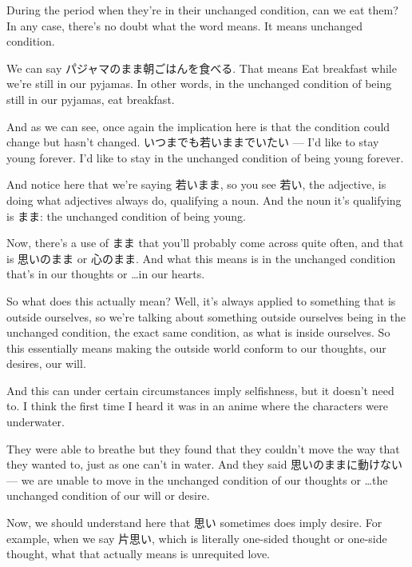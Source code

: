 During the period when they're in their unchanged condition, can we eat them? In any case, there's no doubt what the word means. It means unchanged condition.

We can say パジャマのまま朝ごはんを食べる. That means Eat breakfast while we're still in our pyjamas. In other words, in the unchanged condition of being still in our pyjamas, eat breakfast.

{}

And as we can see, once again the implication here is that the condition could change but hasn't changed. いつまでも若いままでいたい --- I'd like to stay young forever. I'd like to stay in the unchanged condition of being young forever.

{}

And notice here that we're saying 若いまま, so you see 若い, the adjective, is doing what adjectives always do, qualifying a noun. And the noun it's qualifying is まま: the unchanged condition of being young.

\thinrule

Now, there's a use of まま that you'll probably come across quite often, and that is 思いのまま or 心のまま. And what this means is in the unchanged condition that's in our thoughts or \ldots{}in our hearts.

{}

So what does this actually mean? Well, it's always applied to something that is outside ourselves, so we're talking about something outside ourselves being in the unchanged condition, the exact same condition, as what is inside ourselves. So this essentially means making the outside world conform to our thoughts, our desires, our will.

And this can under certain circumstances imply selfishness, but it doesn't need to. I think the first time I heard it was in an anime where the characters were underwater.

They were able to breathe but they found that they couldn't move the way that they wanted to, just as one can't in water. And they said 思いのままに動けない --- we are unable to move in the unchanged condition of our thoughts or \ldots{}the unchanged condition of our will or desire.

{}

Now, we should understand here that 思い sometimes does imply desire. For example, when we say 片思い, which is literally one-sided thought or one-side thought, what that actually means is unrequited love.

